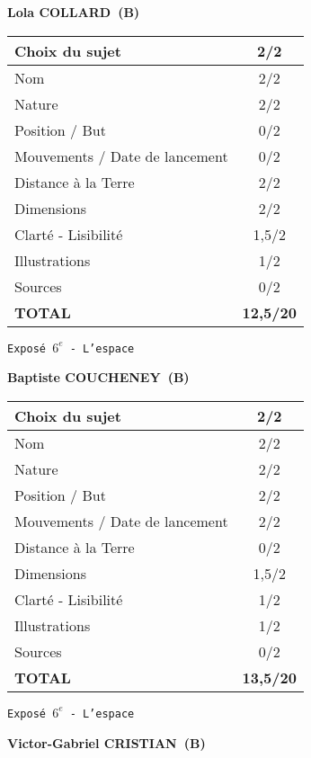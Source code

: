 	\textbf{Lola COLLARD\ (B)}

	\vspace*{2cm}
	\begin{tabular}{|l|c|}
		\hline
		Choix du sujet & 2/2 \\
		\hline
		Nom & 2/2 \\
		\hline
		Nature & 2/2 \\
		\hline
		Position / But & 0/2 \\
		\hline
		Mouvements / Date de lancement & 0/2 \\
		\hline
		Distance \`a la Terre & 2/2 \\
		\hline
		Dimensions & 2/2 \\
		\hline
		Clart\'e - Lisibilit\'e & 1,5/2 \\
		\hline
		Illustrations & 1/2 \\
		\hline
		Sources & 0/2 \\
		\hline
		\textbf{TOTAL}  & \textbf{12,5/20} \\
		\hline
	\end{tabular}
	\newline
	\LARGE{\texttt{Expos\'e $6^e$ - L'espace}}
	\vspace*{1cm}

	\textbf{Baptiste COUCHENEY\ (B)}

	\vspace*{2cm}
	\begin{tabular}{|l|c|}
		\hline
		Choix du sujet & 2/2 \\
		\hline
		Nom & 2/2 \\
		\hline
		Nature & 2/2 \\
		\hline
		Position / But & 2/2 \\
		\hline
		Mouvements / Date de lancement & 2/2 \\
		\hline
		Distance \`a la Terre & 0/2 \\
		\hline
		Dimensions & 1,5/2 \\
		\hline
		Clart\'e - Lisibilit\'e & 1/2 \\
		\hline
		Illustrations & 1/2 \\
		\hline
		Sources & 0/2 \\
		\hline
		\textbf{TOTAL}  & \textbf{13,5/20} \\
		\hline
	\end{tabular}
	\newline
	\LARGE{\texttt{Expos\'e $6^e$ - L'espace}}
	\vspace*{1cm}

	\textbf{Victor-Gabriel CRISTIAN\ (B)}

